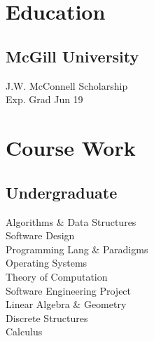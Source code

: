 \documentclass[]{allanwang-resume}
\begin{document}
 
\header

\hspace*{-\parindent}%
\begin{minipage}[t][][b]{0.33\textwidth}~

	~\\


	\section{Education}
	\subsection{McGill University}
	J.W. McConnell Scholarship \\
	Exp. Grad Jun 19
	\sectionsep

	\section{Course Work}
	\subsection{Undergraduate}
	Algorithms \& Data Structures \\
	Software Design \\
	Programming Lang \& Paradigms \\
	Operating Systems \\
	Theory of Computation \\
	Software Engineering Project \\
	Linear Algebra \& Geometry \\
	Discrete Structures \\
	Calculus \\
	\sectionsep


\end{minipage}
\end{document}
